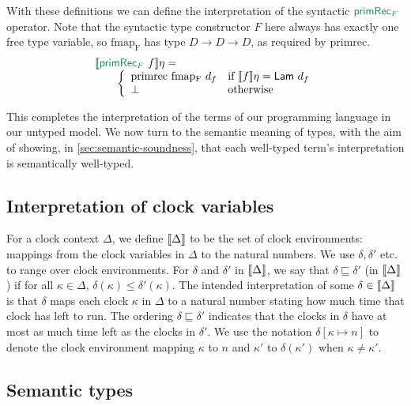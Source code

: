 With these definitions we can define the interpretation of the
syntactic $\elim{primRec$_F$}$ operator. Note that the syntactic type
constructor $F$ here always has exactly one free type variable, so
$\mathrm{fmap_F}$ has type $D \to D \to D$, as required by
$\mathrm{primrec}$.
\begin{displaymath}
  \begin{array}{l}
    \sem{\elim{primRec$_F$}\ f}\eta = \\
    \quad\quad\left\{
      \begin{array}{ll}
        \mathrm{primrec}\ \mathrm{fmap_F}\ d_f & \textrm{if }\sem{f}\eta = \semCons{Lam}\ d_f \\
        \bot & \textrm{otherwise}
      \end{array}
    \right.
  \end{array}
\end{displaymath}

This completes the interpretation of the terms of our programming
language in our untyped model. We now turn to the semantic meaning of
types, with the aim of showing, in \autoref{sec:semantic-soundness},
that each well-typed term's interpretation is semantically well-typed.

\subsection{Interpretation of clock variables}
\label{sec:clock-envs}

For a clock context $\Delta$, we define $\llbracket \Delta \rrbracket$ to be the
set of clock environments: mappings from the clock variables in
$\Delta$ to the natural numbers. We use $\delta, \delta'$ etc. to
range over clock environments. For $\delta$ and $\delta'$ in
$\llbracket \Delta \rrbracket$, we say that $\delta \sqsubseteq \delta'$ (in
$\llbracket \Delta \rrbracket$) if for all $\kappa \in \Delta$, $\delta(\kappa) \leq
\delta'(\kappa)$. The intended interpretation of some $\delta \in
\llbracket \Delta \rrbracket$ is that $\delta$ maps each clock $\kappa$ in $\Delta$
to a natural number stating how much time that clock has left to
run. The ordering $\delta \sqsubseteq \delta'$ indicates that the
clocks in $\delta$ have at most as much time left as the clocks in
$\delta'$. We use the notation $\delta[\kappa \mapsto n]$ to denote
the clock environment mapping $\kappa$ to $n$ and $\kappa'$ to
$\delta(\kappa')$ when $\kappa \not= \kappa'$.

\subsection{Semantic types}
\label{sec:semantic-types}

